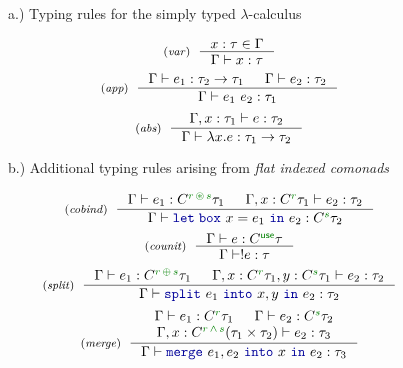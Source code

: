 \begin{figure}[t]

{\small a.) Typing rules for the simply typed $\lambda$-calculus}

\begin{equation*}
\tyrule{var}
  {x : \tau \in \Gamma}
  {\Gamma \vdash x : \tau }
\end{equation*}
\begin{equation*}
\tyrule{app}
  {\Gamma \vdash e_1 : \tau_2 \rightarrow \tau_1 &
   \Gamma \vdash e_2 : \tau_2 }
  {\Gamma \vdash e_1~e_2 : \tau_1 }
\end{equation*}
\begin{equation*}
\tyrule{abs}
  {\Gamma, x:\tau_1 \vdash e : \tau_2}
  {\Gamma \vdash \lambda x.e : \tau_1 \rightarrow \tau_2 }
\end{equation*}

\vspace{1em}
{\small b.) Additional typing rules arising from \emph{flat indexed comonads}}

\begin{equation*}
\tyrule{cobind}
  {\Gamma \vdash e_1 : \ctyp{\cclrd{r}\,\cseq\,\cclrd{s}}{\tau_1} & \Gamma, x : \ctyp{\cclrd{r}}{\tau_1} \vdash e_2 : \tau_2 }
  {\Gamma \vdash \kvd{let\;box}~x=e_1~\kvd{in}~e_2 : \ctyp{\cclrd{s}}{\tau_2}}
\end{equation*}
\begin{equation*}
\tyrule{counit}
  {\Gamma \vdash e : \ctyp{\cunit}{\tau}}
  {\Gamma \vdash !e : \tau}
\end{equation*}
\begin{equation*}
\tyrule{split}
  {\Gamma \vdash e_1 : \ctyp{\cclrd{r}\,\cpar\,\cclrd{s}}{\tau_1} &
   \Gamma, x:\ctyp{\cclrd{r}}{\tau_1}, y:\ctyp{\cclrd{s}}{\tau_1} \vdash e_2 : \tau_2 }
  {\Gamma \vdash \kvd{split}~e_1~\kvd{into}~x,y~\kvd{in}~e_2 : \tau_2 }
\end{equation*}
\begin{equation*}
\tyrule{merge}
  {\Gamma \vdash e_1 : \ctyp{\cclrd{r}}{\tau_1} &
   \Gamma \vdash e_2 : \ctyp{\cclrd{s}}{\tau_2} \\
   \Gamma, x:\ctyp{\cclrd{r}\,\czip\,\cclrd{s}}{(\tau_1 \times \tau_2)} \vdash e_2 : \tau_3 }
  {\Gamma \vdash \kvd{merge}~e_1, e_2~\kvd{into}~x~\kvd{in}~e_2 : \tau_3 }
\end{equation*}

\label{fig:conclusions-cml}
\end{figure}

